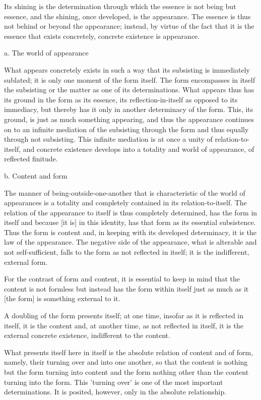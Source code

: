 Its shining is the determination through which
the essence is not being but essence,
and the shining, once developed, is the appearance.
The essence is thus not behind or beyond the appearance;
instead, by virtue of the fact that it is
the essence that exists concretely,
concrete existence is appearance.

a. The world of appearance

What appears concretely exists in such a way
that its subsisting is immediately sublated;
it is only one moment of the form itself.
The form encompasses in itself the subsisting
or the matter as one of its determinations.
What appears thus has its ground in the form
as its essence, its reflection-in-itself
as opposed to its immediacy, but thereby has it
only in another determinacy of the form.
This, its ground, is just as much something appearing,
and thus the appearance continues on to an infinite mediation
of the subsisting through the form
and thus equally through not subsisting.
This infinite mediation is at once
a unity of relation-to-itself,
and concrete existence develops into a totality
and world of appearance, of reflected finitude.

b. Content and form

The manner of being-outside-one-another that is
characteristic of the world of appearances is
a totality and completely contained in its relation-to-itself.
The relation of the appearance to itself is
thus completely determined, has the form in itself
and because [it is] in this identity,
has that form as its essential subsistence.
Thus the form is content and,
in keeping with its developed determinacy,
it is the law of the appearance.
The negative side of the appearance,
what is alterable and not self-sufficient,
falls to the form as not reflected in itself;
it is the indifferent, external form.

    For the contrast of form and content,
    it is essential to keep in mind that
    the content is not formless but
    instead has the form within itself
    just as much as it [the form] is
    something external to it.

    A doubling of the form presents itself;
    at one time,
    insofar as it is reflected in itself,
    it is the content and,
    at another time,
    as not reflected in itself,
    it is the external concrete existence,
    indifferent to the content.

    What presents itself here in itself is
    the absolute relation of content and of form, namely,
    their turning over and into one another,
    so that the content is nothing but the form turning into content
    and the form nothing other than the content turning into the form.
    This 'turning over' is one of the most important determinations.
    It is posited, however, only in the absolute relationship.

